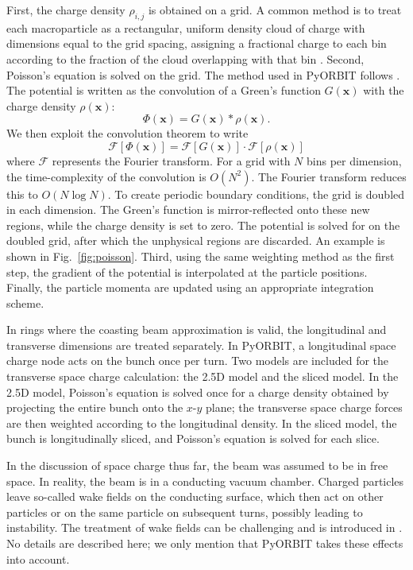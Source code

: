 First, the charge density $\rho_{i,j}$ is obtained on a grid. A common method is to treat each macroparticle as a rectangular, uniform density cloud of charge with dimensions equal to the grid spacing, assigning a fractional charge to each bin according to the fraction of the cloud overlapping with that bin \cite{Birdsall1975}. Second, Poisson’s equation is solved on the grid. The method used in PyORBIT follows \cite{Hockney1981}. The potential is written as the convolution of a Green's function $G(\mathbf{x})$ with the charge density $\rho(\mathbf{x})$:
%
\begin{equation}
    \Phi(\mathbf{x}) = G(\mathbf{x}) * \rho(\mathbf{x}).
\end{equation}
%
We then exploit the convolution theorem \cite{Arfken1985} to write
%
\begin{equation}
    \mathcal{F}[\Phi(\mathbf{x})]
    =
    \mathcal{F}[G(\mathbf{x})] \cdot \mathcal{F}[\rho(\mathbf{x})]
\end{equation}
%
where $\mathcal{F}$ represents the Fourier transform. For a grid with $N$ bins per dimension, the time-complexity of the convolution is $O(N^2)$. The Fourier transform reduces this to $O(N \log N)$. To create periodic boundary conditions, the grid is doubled in each dimension. The Green's function is mirror-reflected onto these new regions, while the charge density is set to zero. The potential is solved for on the doubled grid, after which the unphysical regions are discarded. An example is shown in Fig.~\ref{fig:poisson}. Third, using the same weighting method as the first step, the gradient of the potential is interpolated at the particle positions. Finally, the particle momenta are updated using an appropriate integration scheme. 

In rings where the coasting beam approximation is valid, the longitudinal and transverse dimensions are treated separately. In PyORBIT, a longitudinal space charge node acts on the bunch once per turn. Two models are included for the transverse space charge calculation: the 2.5D model and the sliced model. In the 2.5D model, Poisson’s equation is solved once for a charge density obtained by projecting the entire bunch onto the $x$-$y$ plane; the transverse space charge forces are then weighted according to the longitudinal density. In the sliced model, the bunch is longitudinally sliced, and Poisson’s equation is solved for each slice.

In the discussion of space charge thus far, the beam was assumed to be in free space. In reality, the beam is in a conducting vacuum chamber. Charged particles leave so-called wake fields on the conducting surface, which then act on other particles or on the same particle on subsequent turns, possibly leading to instability. The treatment of wake fields can be challenging and is introduced in \cite{Chao1993}. No details are described here; we only mention that PyORBIT takes these effects into account.



